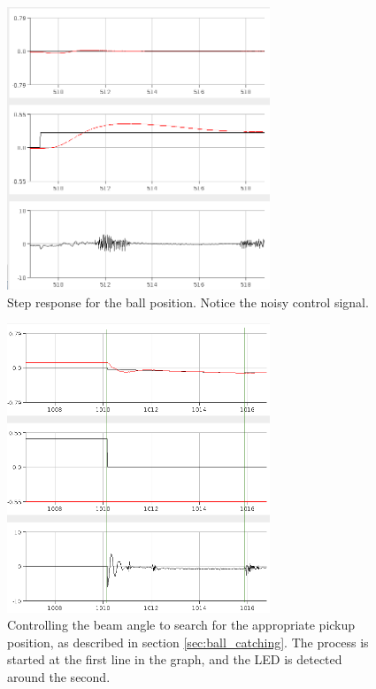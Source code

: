 \begin{figure}[h]
\centering
\includegraphics[width=0.7\textwidth]{figures/stepresponseball1-crop.png}
\caption{Step response for the ball position. Notice the noisy control signal.}
\label{fig:stepresponseball}
\end{figure}

\begin{figure}[h]
\centering
\includegraphics[width=0.7\textwidth]{figures/topickupposition-crop.png}
\caption{Controlling the beam angle to search for the appropriate pickup position, as described in section \ref{sec:ball_catching}. The process is started at the first line in the graph, and the LED is detected around the second.}
\label{fig:topickupposition}
\end{figure}

